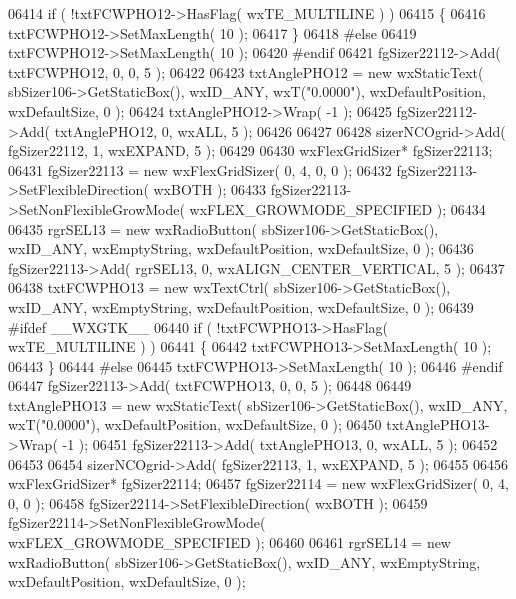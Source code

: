 \begin{DoxyCode}
06414     \textcolor{keywordflow}{if} ( !txtFCWPHO12->HasFlag( wxTE\_MULTILINE ) )
06415     \{
06416     txtFCWPHO12->SetMaxLength( 10 );
06417     \}
06418 \textcolor{preprocessor}{    #else}
06419     txtFCWPHO12->SetMaxLength( 10 );
06420 \textcolor{preprocessor}{    #endif}
06421     fgSizer22112->Add( txtFCWPHO12, 0, 0, 5 );
06422     
06423     txtAnglePHO12 = \textcolor{keyword}{new} wxStaticText( sbSizer106->GetStaticBox(), wxID\_ANY, wxT(\textcolor{stringliteral}{"0.0000"}), 
      wxDefaultPosition, wxDefaultSize, 0 );
06424     txtAnglePHO12->Wrap( -1 );
06425     fgSizer22112->Add( txtAnglePHO12, 0, wxALL, 5 );
06426     
06427     
06428     sizerNCOgrid->Add( fgSizer22112, 1, wxEXPAND, 5 );
06429     
06430     wxFlexGridSizer* fgSizer22113;
06431     fgSizer22113 = \textcolor{keyword}{new} wxFlexGridSizer( 0, 4, 0, 0 );
06432     fgSizer22113->SetFlexibleDirection( wxBOTH );
06433     fgSizer22113->SetNonFlexibleGrowMode( wxFLEX\_GROWMODE\_SPECIFIED );
06434     
06435     rgrSEL13 = \textcolor{keyword}{new} wxRadioButton( sbSizer106->GetStaticBox(), wxID\_ANY, wxEmptyString, wxDefaultPosition, 
      wxDefaultSize, 0 );
06436     fgSizer22113->Add( rgrSEL13, 0, wxALIGN\_CENTER\_VERTICAL, 5 );
06437     
06438     txtFCWPHO13 = \textcolor{keyword}{new} wxTextCtrl( sbSizer106->GetStaticBox(), wxID\_ANY, wxEmptyString, wxDefaultPosition, 
      wxDefaultSize, 0 );
06439 \textcolor{preprocessor}{    #ifdef \_\_WXGTK\_\_}
06440     \textcolor{keywordflow}{if} ( !txtFCWPHO13->HasFlag( wxTE\_MULTILINE ) )
06441     \{
06442     txtFCWPHO13->SetMaxLength( 10 );
06443     \}
06444 \textcolor{preprocessor}{    #else}
06445     txtFCWPHO13->SetMaxLength( 10 );
06446 \textcolor{preprocessor}{    #endif}
06447     fgSizer22113->Add( txtFCWPHO13, 0, 0, 5 );
06448     
06449     txtAnglePHO13 = \textcolor{keyword}{new} wxStaticText( sbSizer106->GetStaticBox(), wxID\_ANY, wxT(\textcolor{stringliteral}{"0.0000"}), 
      wxDefaultPosition, wxDefaultSize, 0 );
06450     txtAnglePHO13->Wrap( -1 );
06451     fgSizer22113->Add( txtAnglePHO13, 0, wxALL, 5 );
06452     
06453     
06454     sizerNCOgrid->Add( fgSizer22113, 1, wxEXPAND, 5 );
06455     
06456     wxFlexGridSizer* fgSizer22114;
06457     fgSizer22114 = \textcolor{keyword}{new} wxFlexGridSizer( 0, 4, 0, 0 );
06458     fgSizer22114->SetFlexibleDirection( wxBOTH );
06459     fgSizer22114->SetNonFlexibleGrowMode( wxFLEX\_GROWMODE\_SPECIFIED );
06460     
06461     rgrSEL14 = \textcolor{keyword}{new} wxRadioButton( sbSizer106->GetStaticBox(), wxID\_ANY, wxEmptyString, wxDefaultPosition, 
      wxDefaultSize, 0 );

\end{DoxyCode}
